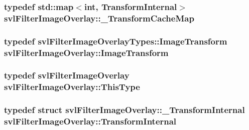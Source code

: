 \subsubsection[{\+\_\+\+Transform\+Cache\+Map}]{\setlength{\rightskip}{0pt plus 5cm}typedef std\+::map$<$int, {\bf Transform\+Internal}$>$ {\bf svl\+Filter\+Image\+Overlay\+::\+\_\+\+Transform\+Cache\+Map}\hspace{0.3cm}{\ttfamily [protected]}}\label{classsvl_filter_image_overlay_ae7f68bdaad7a6718f5d38e99099fd1a4}
\hypertarget{classsvl_filter_image_overlay_a68354a171b2498de3aa1c5ba0ff2f002}{}
\subsubsection[{Image\+Transform}]{\setlength{\rightskip}{0pt plus 5cm}typedef svl\+Filter\+Image\+Overlay\+Types\+::\+Image\+Transform {\bf svl\+Filter\+Image\+Overlay\+::\+Image\+Transform}}\label{classsvl_filter_image_overlay_a68354a171b2498de3aa1c5ba0ff2f002}
\hypertarget{classsvl_filter_image_overlay_a9e4175de9ad9d65a5621a9fd78da6227}{}
\subsubsection[{This\+Type}]{\setlength{\rightskip}{0pt plus 5cm}typedef {\bf svl\+Filter\+Image\+Overlay} {\bf svl\+Filter\+Image\+Overlay\+::\+This\+Type}}\label{classsvl_filter_image_overlay_a9e4175de9ad9d65a5621a9fd78da6227}
\hypertarget{classsvl_filter_image_overlay_a18061cddeca5ead367351cc833ce7c4e}{}
\subsubsection[{Transform\+Internal}]{\setlength{\rightskip}{0pt plus 5cm}typedef struct {\bf svl\+Filter\+Image\+Overlay\+::\+\_\+\+Transform\+Internal}  {\bf svl\+Filter\+Image\+Overlay\+::\+Transform\+Internal}\hspace{0.3cm}{\ttfamily [protected]}}\label{classsvl_filter_image_overlay_a18061cddeca5ead367351cc833ce7c4e}


